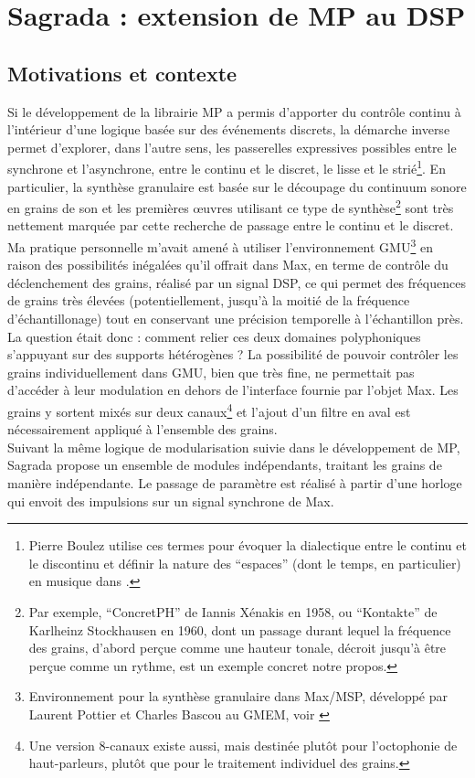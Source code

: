 \section{Sagrada : extension de MP au DSP}
\label{sec:algorithms:sagrada}

\subsection{Motivations et contexte}

\noindent Si le développement de la librairie MP a permis d'apporter du contrôle continu à l'intérieur d'une logique basée sur des événements discrets, la démarche inverse permet d'explorer, dans l'autre sens, les passerelles expressives possibles entre le synchrone et l'asynchrone, entre le continu et le discret, le lisse et le strié\footnote{Pierre Boulez utilise ces termes pour évoquer la dialectique entre le continu et le discontinu et définir la nature des ``espaces'' (dont le temps, en particulier) en musique dans \cite{boulez_penser_1987}.}. En particulier, la synthèse granulaire est basée sur le découpage du continuum sonore en grains de son et les premières œuvres utilisant ce type de synthèse\footnote{Par exemple, ``ConcretPH'' de Iannis Xénakis en 1958, ou ``Kontakte'' de Karlheinz Stockhausen en 1960, dont un passage durant lequel la fréquence des grains, d'abord perçue comme une hauteur tonale, décroit jusqu'à être perçue comme un rythme, est un exemple concret notre propos.} sont très nettement marquée par cette recherche de passage entre le continu et le discret.\\
\indent Ma pratique personnelle m'avait amené à utiliser l'environnement \gls{GMU}\footnote{Environnement pour la synthèse granulaire dans Max/MSP, développé par Laurent Pottier et Charles Bascou au \gls{GMEM}, voir \cite{bascou_gmu_2005}} en raison des possibilités inégalées qu'il offrait dans Max, en terme de contrôle du déclenchement des grains, réalisé par un signal \gls{DSP}, ce qui permet des fréquences de grains très élevées (potentiellement, jusqu'à la moitié de la fréquence d'échantillonage) tout en conservant une précision temporelle à l'échantillon près.\\
\indent La question était donc : comment relier ces deux domaines polyphoniques s'appuyant sur des supports hétérogènes ? La possibilité de pouvoir contrôler les grains individuellement dans \gls{GMU}, bien que très fine, ne permettait pas d'accéder à leur modulation en dehors de l'interface fournie par l'objet Max. Les grains y sortent mixés sur deux canaux\footnote{Une version 8-canaux existe aussi, mais destinée plutôt pour l'octophonie de haut-parleurs, plutôt que pour le traitement individuel des grains.} et l'ajout d'un filtre en aval est nécessairement appliqué à l'ensemble des grains.\\
\indent Suivant la même logique de modularisation suivie dans le développement de MP, Sagrada propose un ensemble de modules indépendants, traitant les grains de manière indépendante. Le passage de paramètre est réalisé à partir d'une horloge qui envoit des impulsions sur un signal synchrone de Max.

